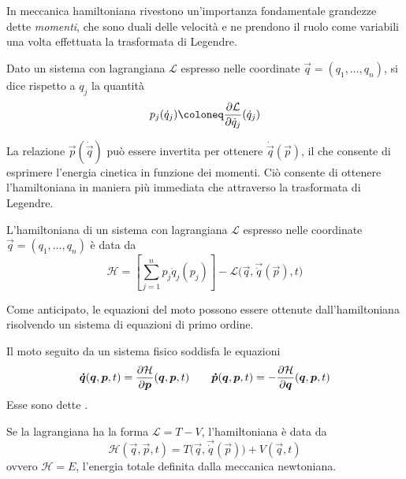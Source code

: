 In meccanica hamiltoniana rivestono un'importanza fondamentale grandezze dette \emph{momenti}, che sono duali delle velocità e ne prendono il ruolo come variabili una volta effettuata la trasformata di Legendre.
\begin{definition}
  Dato un sistema con lagrangiana $\mathcal{L}$ espresso nelle coordinate $\vec{q}=(q_1, \ldots, q_n)$, si dice  rispetto a $q_j$ la quantità \begin{equation}
  p_j(\dot{q}_j) \defeq \pdv{\mathcal{L}}{\dot{q}_j}() (\dot{q}_j)
  \end{equation} 
\end{definition}

La relazione $\vec{p}(\dot{\vec{q}})$ può essere invertita per ottenere $\dot{\vec{q}}(\vec{p})$, il che consente di esprimere l'energia cinetica in funzione dei momenti. Ciò consente di ottenere l'hamiltoniana in maniera più immediata che attraverso la trasformata di Legendre.
\begin{theorem}
  L'hamiltoniana di un sistema con lagrangiana $\mathcal{L}$ espresso nelle coordinate $\vec{q}=(q_1, \ldots, q_n)$ è data da \begin{equation}
  \mathcal{H} = \left[\sum_{j=1}^{n} p_j \dot{q}_j (p_j)\right] - \mathcal{L}\big(\vec{q}, \vec{\dot{q}}(\vec{p}), t\big)
  \end{equation} 
\end{theorem}

Come anticipato, le equazioni del moto possono essere ottenute dall'hamiltoniana risolvendo un sistema di equazioni di primo ordine.
\begin{theorem}
  Il moto seguito da un sistema fisico soddisfa le equazioni \begin{equation}
  \boldsymbol{\dot{q}}(\boldsymbol{q},\boldsymbol{p},t) = \pdv{\mathcal{H}}{\boldsymbol{p}}()(\boldsymbol{q},\boldsymbol{p},t) \qquad \boldsymbol{\dot{p}}(\boldsymbol{q},\boldsymbol{p},t) = -\pdv{\mathcal{H}}{\boldsymbol{q}}()(\boldsymbol{q},\boldsymbol{p},t)
  \end{equation}
  Esse sono dette .
\end{theorem}

\begin{theorem}
  Se la lagrangiana ha la forma $\mathcal{L} = T - V$, l'hamiltoniana è data da \begin{equation}
  \mathcal{H}(\vec{q},\vec{p},t) = T\big(\vec{q},\vec{\dot{q}}(\vec{p})\big) + V(\vec{q},t)
  \end{equation} 
  ovvero $\mathcal{H} = E$, l'energia totale definita dalla meccanica newtoniana.
\end{theorem}

